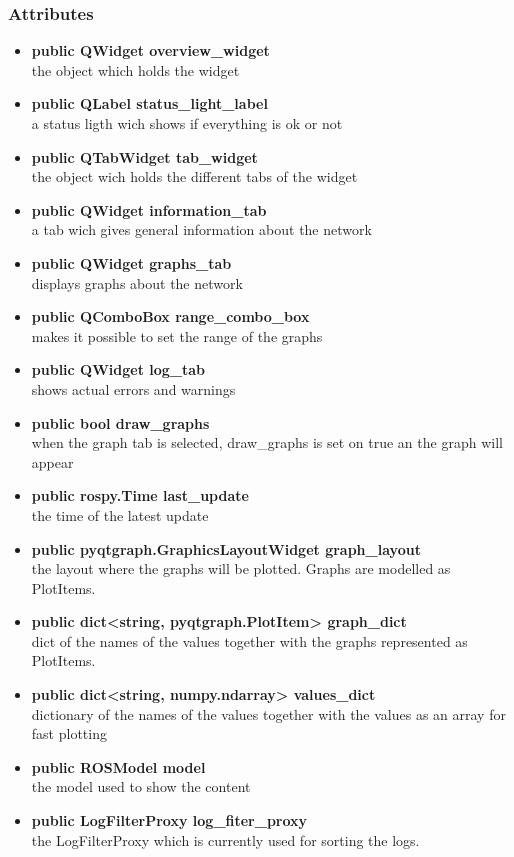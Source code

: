 \subsubsection{Attributes}
\begin{itemize}
  \item \textbf{public QWidget overview\_widget}\\
  the object which holds the widget
  \item \textbf{public QLabel status\_light\_label}\\
  a status ligth wich shows if everything is ok or not
  \item \textbf{public QTabWidget tab\_widget}\\
  the object wich holds the different tabs of the widget
  \item \textbf{public QWidget information\_tab}\\
  a tab wich gives general information about the network 
  \item \textbf{public QWidget graphs\_tab}\\
  displays graphs about the network
  \item \textbf{public QComboBox range\_combo\_box}\\
  makes it possible to set the range of the graphs
  \item \textbf{public QWidget log\_tab}\\
  shows actual errors and warnings
  \item \textbf{public bool draw\_graphs}\\
  when the graph tab is selected, draw\_graphs is set on true an the graph will
  appear
  \item \textbf{public rospy.Time last\_update}\\
  the time of the latest update
  \item \textbf{public pyqtgraph.GraphicsLayoutWidget graph\_layout}\\
  the layout where the graphs will be plotted. Graphs are modelled as PlotItems.
  \item \textbf{public dict<string, pyqtgraph.PlotItem> graph\_dict}\\
  dict of the names of the values together with the graphs represented as PlotItems.
  \item \textbf{public dict<string, numpy.ndarray> values\_dict}\\
  dictionary of the names of the values together with the values as an array for fast plotting
  \item \textbf{public ROSModel model}\\
  the model used to show the content
  \item \textbf{public LogFilterProxy log\_fiter\_proxy}\\
  the LogFilterProxy which is currently used for sorting the logs.
  
\end{itemize}
